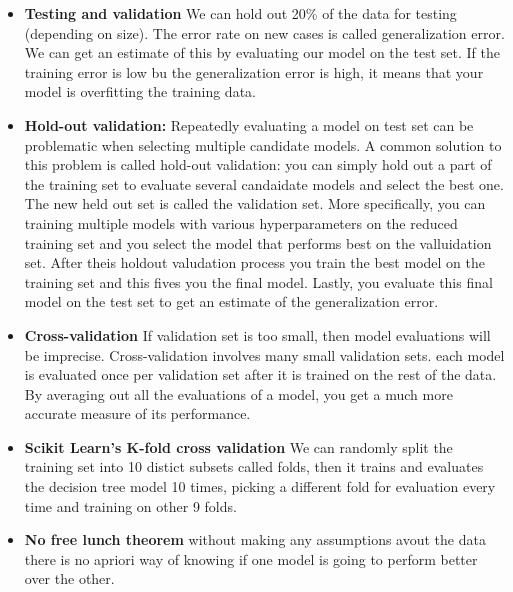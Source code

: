 \documentclass[openany]{book}
\begin{document}
\begin{itemize}
    \item \textbf{Testing and validation} We can hold out 20\% of the data for testing (depending on size). The error rate on new cases is called generalization error. We can get an estimate of this by evaluating our model on the test set. If the training error is low bu the generalization error is high, it means that your model is overfitting the training data.  

    \item \textbf{Hold-out validation:} Repeatedly evaluating a model on test set can be problematic when selecting multiple candidate models. A common solution to this problem is called hold-out validation: you can simply hold out a part of the training set to evaluate several candaidate models and select the best one. The new held out set is called the validation set. More specifically, you can training multiple models with various hyperparameters on the reduced training set and you select the model that performs best on the valluidation set. After theis holdout valudation process you train the best model on the training set and this fives you the final model. Lastly, you evaluate this final model on the test set to get an estimate of the generalization error. 
    
    \item \textbf{Cross-validation} If validation set is too small, then model evaluations will be imprecise. Cross-validation involves many small validation sets. each model is evaluated once per validation set after it is trained on the rest of the data. By averaging out all the evaluations of a model, you get a much more accurate measure of its performance. 

    \item \textbf{Scikit Learn's K-fold cross validation} We can randomly split the training set into 10 distict subsets called folds, then it trains and evaluates the decision tree model 10 times, picking a different fold for evaluation every time and training on other 9 folds. 

    \item \textbf{No free lunch theorem} without making any assumptions avout the data there is no apriori way of knowing if one model is going to perform better over the other. 
 
\end{itemize}
\end{document}

